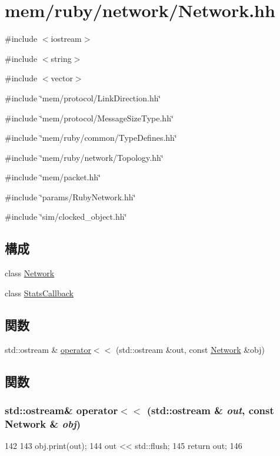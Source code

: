 \hypertarget{Network_8hh}{
\section{mem/ruby/network/Network.hh}
\label{Network_8hh}
}
{\ttfamily \#include $<$iostream$>$}\par
{\ttfamily \#include $<$string$>$}\par
{\ttfamily \#include $<$vector$>$}\par
{\ttfamily \#include \char`\"{}mem/protocol/LinkDirection.hh\char`\"{}}\par
{\ttfamily \#include \char`\"{}mem/protocol/MessageSizeType.hh\char`\"{}}\par
{\ttfamily \#include \char`\"{}mem/ruby/common/TypeDefines.hh\char`\"{}}\par
{\ttfamily \#include \char`\"{}mem/ruby/network/Topology.hh\char`\"{}}\par
{\ttfamily \#include \char`\"{}mem/packet.hh\char`\"{}}\par
{\ttfamily \#include \char`\"{}params/RubyNetwork.hh\char`\"{}}\par
{\ttfamily \#include \char`\"{}sim/clocked\_\-object.hh\char`\"{}}\par
\subsection*{構成}
\begin{DoxyCompactItemize}
\item 
class \hyperlink{classNetwork}{Network}
\item 
class \hyperlink{classNetwork_1_1StatsCallback}{StatsCallback}
\end{DoxyCompactItemize}
\subsection*{関数}
\begin{DoxyCompactItemize}
\item 
std::ostream \& \hyperlink{Network_8hh_ae7ec11f9f7b78c4ff463f25c54be2868}{operator$<$$<$} (std::ostream \&out, const \hyperlink{classNetwork}{Network} \&obj)
\end{DoxyCompactItemize}


\subsection{関数}
\hypertarget{Network_8hh_ae7ec11f9f7b78c4ff463f25c54be2868}{
\subsubsection[{operator$<$$<$}]{\setlength{\rightskip}{0pt plus 5cm}std::ostream\& operator$<$$<$ (std::ostream \& {\em out}, \/  const {\bf Network} \& {\em obj})}}
\label{Network_8hh_ae7ec11f9f7b78c4ff463f25c54be2868}



\begin{DoxyCode}
142 {
143     obj.print(out);
144     out << std::flush;
145     return out;
146 }
\end{DoxyCode}
